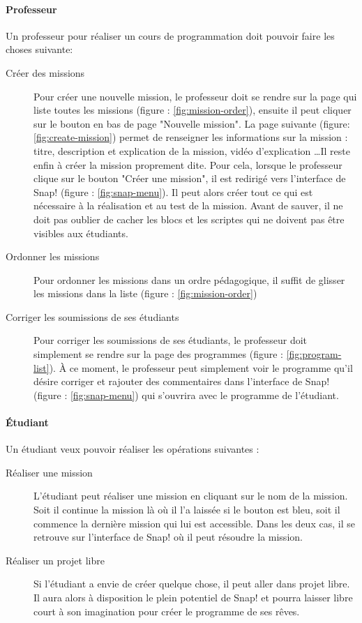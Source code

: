 \paragraph{Professeur}
Un professeur pour réaliser un cours de programmation doit pouvoir faire les choses suivante:\\
\begin{description}
  \item[Créer des missions] Pour créer une nouvelle mission, le professeur doit se rendre sur la page qui liste toutes les missions (figure : \ref{fig:mission-order}), ensuite il peut cliquer sur le bouton en bas de page "Nouvelle mission". La page suivante (figure: \ref{fig:create-mission}) permet de renseigner les informations sur la mission : titre, description et explication de la mission, vidéo d'explication \ldots Il reste enfin à créer la mission proprement dite. Pour cela, lorsque le professeur clique sur le bouton "Créer une mission", il est redirigé vers l'interface de Snap! (figure : \ref{fig:snap-menu}). Il peut alors créer tout ce qui est nécessaire à la réalisation et au test de la mission. Avant de sauver, il ne doit pas oublier de cacher les blocs et les scriptes qui ne doivent pas être visibles aux étudiants.
  \item[Ordonner les missions] Pour ordonner les missions dans un ordre pédagogique, il suffit de glisser les missions dans la liste (figure : \ref{fig:mission-order})
  \item[Corriger les soumissions de ses étudiants] Pour corriger les soumissions de ses étudiants, le professeur doit simplement se rendre sur la page des programmes (figure : \ref{fig:program-list}). À ce moment, le professeur peut simplement voir le programme qu'il désire corriger et rajouter des commentaires dans l'interface de Snap! (figure : \ref{fig:snap-menu}) qui s’ouvrira avec le programme de l'étudiant.
\end{description}

\paragraph{Étudiant}
Un étudiant veux pouvoir réaliser les opérations suivantes :
\begin{description}
  \item[Réaliser une mission] L'étudiant peut réaliser une mission en cliquant sur le nom de la mission. Soit il continue la mission là où il l'a laissée si le bouton est bleu, soit il commence la dernière mission qui lui est accessible. Dans les deux cas, il se retrouve sur l'interface de Snap! où il peut résoudre la mission.
  \item[Réaliser un projet libre] Si l'étudiant a envie de créer quelque chose, il peut aller dans projet libre. Il aura alors à disposition le plein potentiel de Snap! et pourra laisser libre court à son imagination pour créer le programme de ses rêves.
\end{description}
